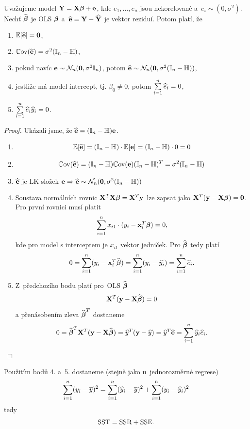 \begin{theorem}
	Uvažujeme model $\Y = \X \betab + \eb$, kde $e_1,\dots, e_n$ jsou nekorelované a~$e_i \sim (0,\sigma^2)$. Nechť $\wbetab$ je OLS $\betab$ a~$\heb = \Y - \hYb$ je vektor reziduí. Potom platí, že

\begin{enumerate}
\item $\E [\heb] = \nula$,
\item $\Cov(\heb) = \sigma^2 (\In - \Hm)$,
\item pokud navíc $\eb \sim \NN_n (\nula, \sigma^2 \In)$, potom $\heb \sim \NN_n (\nula, \sigma^2 (\In - \Hm))$,
\item jestliže má model intercept, tj. $\beta_0 \neq 0$, potom $\sumin \widehat{e}_i = 0$,
\item $\sumin \widehat{e}_i \widehat{y}_i = 0$.
\end{enumerate}		
\end{theorem}

\begin{proof}
Ukázali jsme, že $\heb = (\In - \Hm) \eb$.
\begin{enumerate}
\item $$\E [\heb] = (\In - \Hm) \cdot \E [\eb] = (\In - \Hm) \cdot 0 = 0$$
\item $$\Cov(\heb) = (\In - \Hm) \Cov(\eb) (\In - \Hm)^T = \sigma^2 (\In - \Hm)$$
\item $\heb$ je LK složek $\eb  \Rightarrow  \heb \sim \NN_n (\nula, \sigma^2 (\In - \Hm))$
\item Soustava normálních rovnic $\X^T \X \betab = \X^T \y$ lze zapsat jako $\X^T (\y - \X \betab) = \nula$. Pro první rovnici musí platit
 $$
 \sumin x_{i1} \cdot (y_i - \x_i^T \betab) = 0,
 $$
kde pro model s interceptem je $x_{i1}$ vektor jedniček. Pro $\wbetab$ tedy platí
 $$
 0 = \sumin (y_i - \x_i^T \wbetab) = \sumin (y_i - \widehat{y_i}) = \sumin \he_i.
 $$
\item Z~předchozího bodu platí pro~OLS $\wbetab$
 $$
 \X^T (\y - \X \wbetab) = 0
 $$
a přenásobením zleva $\wbetab^T$ dostaneme
 $$
  0 = \wbetab^T \X^T (\y - \X \wbetab) = \widehat{y}^T (\y - \hy) = \hy^T \heb = \sumin \hy_i \he_i.
 $$
\end{enumerate}
\end{proof}
\begin{remark}
Použitím bodů 4. a~5. dostaneme (stejně jako u~jednorozměrné regrese)
$$
\sumin (y_i - \overline{y})^2 = \sumin (\widehat{y}_i - \overline{y})^2 + \sumin (y_i - \widehat{y}_i)^2
$$
tedy
$$
\SST = \SSR + \SSE.
$$
\end{remark}

